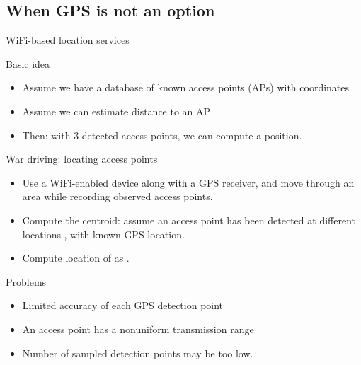 \subsection{When GPS is not an option}
\begin{slide}{WiFi-based location services}
  \begin{block}{Basic idea}
    \begin{itemize}\tightlist
    \item Assume we have a database of known access points (APs) with coordinates
    \item Assume we can estimate distance to an AP
    \item Then: with 3 detected access points, we can compute a position.
    \end{itemize}
  \end{block}
  \begin{block}{War driving: locating access points}
    \begin{itemize}\tightlist
    \item Use a WiFi-enabled device along with a GPS receiver, and move through an area while recording
      observed access points. 
    \item Compute the centroid: assume an access point  has been detected at  different
      locations , with known GPS location.
    \item Compute location of  as .
    \end{itemize}
  \end{block}
  \begin{alertblock}{Problems}
    \begin{itemize}\tightlist
    \item Limited accuracy of each GPS detection point 
    \item An access point has a nonuniform transmission range
    \item Number of sampled detection points  may be too low.
    \end{itemize}
  \end{alertblock}
\end{slide}
